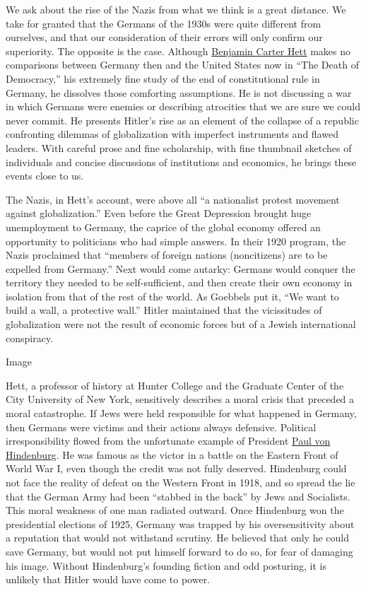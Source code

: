 We ask about the rise of the Nazis from what we think is a great
distance. We take for granted that the Germans of the 1930s were quite
different from ourselves, and that our consideration of their errors
will only confirm our superiority. The opposite is the case. Although
\href{http://urban.hunter.cuny.edu/~hett/}{Benjamin Carter Hett} makes
no comparisons between Germany then and the United States now in ``The
Death of Democracy,'' his extremely fine study of the end of
constitutional rule in Germany, he dissolves those comforting
assumptions. He is not discussing a war in which Germans were enemies or
describing atrocities that we are sure we could never commit. He
presents Hitler's rise as an element of the collapse of a republic
confronting dilemmas of globalization with imperfect instruments and
flawed leaders. With careful prose and fine scholarship, with fine
thumbnail sketches of individuals and concise discussions of
institutions and economics, he brings these events close to us.

The Nazis, in Hett's account, were above all ``a nationalist protest
movement against globalization.'' Even before the Great Depression
brought huge unemployment to Germany, the caprice of the global economy
offered an opportunity to politicians who had simple answers. In their
1920 program, the Nazis proclaimed that ``members of foreign nations
(noncitizens) are to be expelled from Germany.'' Next would come
autarky: Germans would conquer the territory they needed to be
self-sufficient, and then create their own economy in isolation from
that of the rest of the world. As Goebbels put it, ``We want to build a
wall, a protective wall.'' Hitler maintained that the vicissitudes of
globalization were not the result of economic forces but of a Jewish
international conspiracy.

Image

Hett, a professor of history at Hunter College and the Graduate Center
of the City University of New York, sensitively describes a moral crisis
that preceded a moral catastrophe. If Jews were held responsible for
what happened in Germany, then Germans were victims and their actions
always defensive. Political irresponsibility flowed from the unfortunate
example of President
\href{https://www.britannica.com/biography/Paul-von-Hindenburg}{Paul von
Hindenburg}. He was famous as the victor in a battle on the Eastern
Front of World War I, even though the credit was not fully deserved.
Hindenburg could not face the reality of defeat on the Western Front in
1918, and so spread the lie that the German Army had been ``stabbed in
the back'' by Jews and Socialists. This moral weakness of one man
radiated outward. Once Hindenburg won the presidential elections of
1925, Germany was trapped by his oversensitivity about a reputation that
would not withstand scrutiny. He believed that only he could save
Germany, but would not put himself forward to do so, for fear of
damaging his image. Without Hindenburg's founding fiction and odd
posturing, it is unlikely that Hitler would have come to power.

